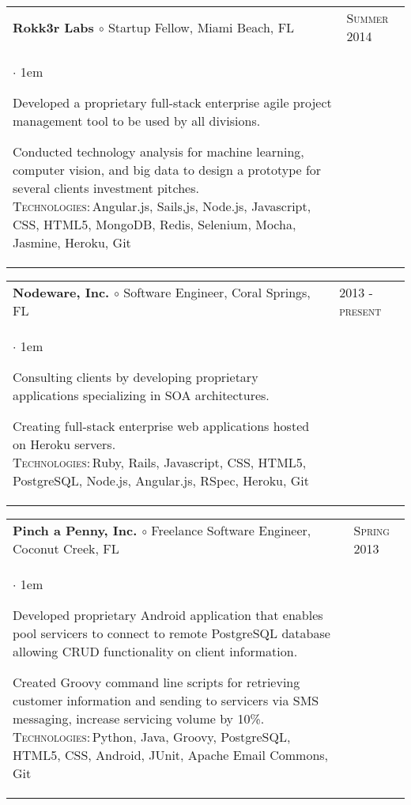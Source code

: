 \documentclass[11pt]{article}
\makeatletter
\newcommand{\employer}[4]
    {{ \begin{tabular}{l@{\hspace{5mm}}|p{30mm}}
       \multicolumn{1}{l}{\textbf{#1 $\circ$ }#2}&\multicolumn{1}{p{30mm}}{\hspace{-3mm}\textsc{#3}} \\
       \parbox{.825\textwidth}{#4 \vspace*{-4pt}}
       \end{tabular} \vspace{4pt} }}
\newenvironment{achievements}           %
    {\begin{list}{$\cdot$}{\topsep 0pt \itemsep 4pt \parsep 0pt \leftmargin 1em}
     \linespread{1.05} \selectfont %
    }
    {\end{list}\vspace*{4pt}}
\def\kt{\vspace*{2pt}\\\textsc{Technologies:\,}}
\makeatother
\begin{document}
\employer{Rokk3r Labs}{Startup Fellow, Miami Beach, FL}{Summer 2014}{
\begin{achievements}

\item{Developed a proprietary full-stack enterprise agile project management tool to be used by all divisions.}

\item{Conducted technology analysis for machine learning, computer vision, and big data to design a prototype for several clients investment pitches. \kt Angular.js, Sails,js, Node.js, Javascript, CSS, HTML5, MongoDB, Redis, Selenium, Mocha, Jasmine, Heroku, Git}

\end{achievements}
}

\employer{Nodeware, Inc.}{Software Engineer, Coral Springs, FL}{2013 - present}{
\begin{achievements}

\item{Consulting clients by developing proprietary applications specializing in SOA architectures.}

\item{Creating full-stack enterprise web applications hosted on Heroku servers. \kt Ruby, Rails, Javascript, CSS, HTML5, PostgreSQL, Node.js, Angular.js, RSpec, Heroku, Git}

\end{achievements}
}


\employer{Pinch a Penny, Inc.}{Freelance Software Engineer, Coconut Creek, FL}{Spring 2013}{
    \begin{achievements}

    \item{Developed proprietary Android application that enables pool servicers to connect to remote PostgreSQL database allowing CRUD functionality on client information.}

    \item{Created Groovy command line scripts for retrieving customer information and sending to servicers via SMS messaging, increase servicing volume by 10\%.  \kt Python, Java, Groovy, PostgreSQL, HTML5, CSS, Android, JUnit, Apache Email Commons, Git}

    \end{achievements}
}
\end{document}
